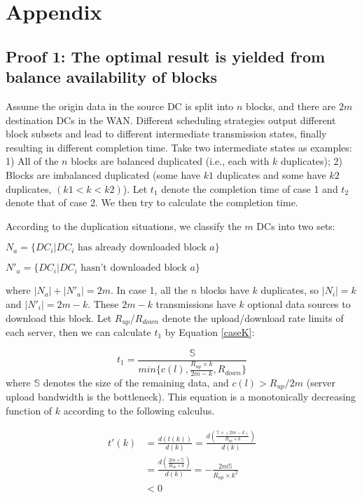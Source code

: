 \section{Appendix}
\subsection{Proof 1: The optimal result is yielded from balance availability of blocks}\label{appendix:balance}
Assume the origin data in the source DC is split into $n$ blocks, and there are $2m$ destination DCs in the WAN. Different scheduling strategies output different block subsets and lead to different intermediate transmission states, finally resulting in different completion time. Take two intermediate states as examples: 1) All of the $n$ blocks are balanced duplicated (i.e., each with $k$ duplicates); 2) Blocks are imbalanced duplicated (some have $k1$ duplicates and some have $k2$ duplicates, $(k1<k<k2)$). Let $t_1$ denote the completion time of case 1 and $t_2$ denote that of case 2. We then try to calculate the completion time.
 
According to the duplication situations, we classify the $m$ DCs into two sets:

$N_a = \{DC_i|DC_i \text{ has already downloaded block $a$}\}$

$N'_a = \{DC_i|DC_i \text{ hasn't downloaded block $a$}\}$

where $|N_a| + |N'_a| = 2m$. In case 1, all the $n$ blocks have $k$ duplicates, so $|N_i| = k$ and $|N'_i| = 2m-k$. These $2m-k$ transmissions have $k$ optional data sources to download this block. Let $R_{up}$/$R_{down}$ denote the upload/download rate limits of each server, then we can calculate $t_1$ by Equation \ref{caseK}:

\begin{equation}
\label{caseK}
t_1 = \frac{\mathbb{S}}{min\{c(l),\frac{R_{up}\times k}{2m-k},R_{down}\}}
\end{equation}
where $\mathbb{S}$ denotes the size of the remaining data, and $c(l) > R_{up}/2m$ (server upload bandwidth is the bottleneck). This equation is a monotonically decreasing function of $k$ according to the following calculus.

\begin{equation}
\label{calculus}
\begin{split}
t'(k) &= \frac{d(t(k))}{d(k)} = \frac{d(\frac{\mathbb{S}\times (2m-k)}{R_{up}\times k})}{d(k)} \\
    &= \frac{d(\frac{2m\times \mathbb{S}}{R_{up}\times k})}{d(k)} = -\frac{2m\mathbb{S}}{R_{up}\times k^2} \\
    &< 0
\end{split}
\end{equation}

